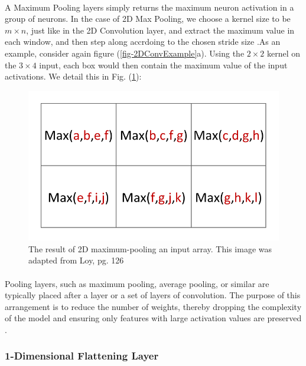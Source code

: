 \documentclass[12pt,letterpaper]{article}
\begin{document}
\paragraph*{}A Maximum Pooling layers simply returns the maximum neuron activation in a group of neurons. In the case of 2D Max Pooling, we choose a kernel size to be $m \times n$, just like in the 2D Convolution layer, and extract the maximum value in each window, and then step along accrdoing to the chosen stride size \cite{Loy,Goodfellow}.As an example, consider again figure (\ref{fig-2DConvExample}a). Using the $2 \times 2$ kernel on the $3 \times 4$ input, each box would then contain the maximum value of the input activations. We detail this in Fig. (\ref{fig-2DMaxPool}):
\begin{figure}[h]
\label{fig-2DMaxPool}
\begin{center}
\includegraphics[scale=0.6]{../figures/2DConvExample(d)}
\end{center}
\caption{The result of 2D maximum-pooling an input array. This image was adapted from Loy, pg. 126 \cite{Loy}}
\end{figure} 

\paragraph*{}Pooling layers, such as maximum pooling, average pooling, or similar are typically placed after a layer or a set of layers of convolution. The purpose of this arrangement is to reduce the number of weights, thereby dropping the complexity of the model and ensuring only features with large activation values are preserved \cite{Geron,Loy,Goodfellow}.


\subsubsection{1-Dimensional Flattening Layer}
\label{subsubsec-1DFlatten}
\end{document}
